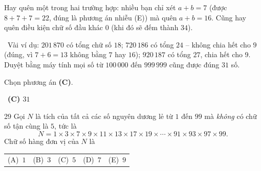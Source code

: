 \documentclass[11pt]{article}
\makeatletter
\providecommand{\AnsWord}{Đáp số}
\newcommand{\ans}[1]{\par\smallskip{\bfseries\color{tmGreen!88!black}\AnsWord:}\ {\bfseries\color{AnsRed}#1}\par}
\newcommand{\verify}[1]{\par\smallskip\noindent{\bfseries\color{tmGreen!80!black}\faCheckCircle\ \CheckWord}\ #1\par}
\newcommand{\choices}[5]{\par\smallskip\noindent
  \begin{tabularx}{\linewidth}{@{}XXXXX@{}}(A)\ #1&(B)\ #2&(C)\ #3&(D)\ #4&(E)\ #5\end{tabularx}\par}
\def\AnsWord{Đáp số}
\def\CheckWord{Thử lại:}
\makeatother
\begin{document}
{\begin{warnbox}Hay quên một trong hai trường hợp: nhiều bạn chỉ xét $a+b=7$ (được $8+7+7=22$, đúng là phương án nhiễu (E)) mà quên $a+b=16$. Cũng hay quên điều kiện chữ số đầu khác $0$ (khi đó sẽ đếm thành $34$).\end{warnbox}

\verify{Vài ví dụ: $201\,870$ có tổng chữ số $18$; $720\,186$ có tổng $24$ -- không chia hết cho $9$ (đúng, vì $7+6=13$ không bằng $7$ hay $16$); $920\,187$ có tổng $27$, chia hết cho $9$. Duyệt bằng máy tính mọi số từ $100\,000$ đến $999\,999$ cũng được đúng $31$ số.}
Chọn phương án \textbf{(C)}.
\ans{(C) $31$}
}

\begin{probbox}{29}{\relax}
Gọi $N$ là tích của tất cả các số nguyên dương lẻ từ $1$ đến $99$ mà \emph{không} có chữ số tận cùng là $5$, tức là
\[N=1\times 3\times 7\times 9\times 11\times 13\times 17\times 19\times\cdots\times 91\times 93\times 97\times 99.\]
Chữ số hàng đơn vị của $N$ là
\choices{$1$}{$3$}{$5$}{$7$}{$9$}
\end{probbox}
\end{document}
